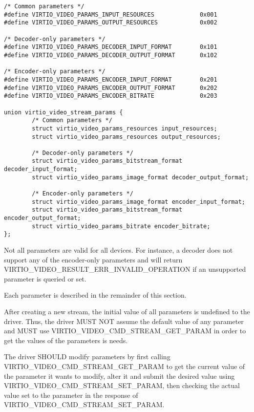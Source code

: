 \begin{lstlisting}
/* Common parameters */
#define VIRTIO_VIDEO_PARAMS_INPUT_RESOURCES             0x001
#define VIRTIO_VIDEO_PARAMS_OUTPUT_RESOURCES            0x002

/* Decoder-only parameters */
#define VIRTIO_VIDEO_PARAMS_DECODER_INPUT_FORMAT        0x101
#define VIRTIO_VIDEO_PARAMS_DECODER_OUTPUT_FORMAT       0x102

/* Encoder-only parameters */
#define VIRTIO_VIDEO_PARAMS_ENCODER_INPUT_FORMAT        0x201
#define VIRTIO_VIDEO_PARAMS_ENCODER_OUTPUT_FORMAT       0x202
#define VIRTIO_VIDEO_PARAMS_ENCODER_BITRATE             0x203

union virtio_video_stream_params {
        /* Common parameters */
        struct virtio_video_params_resources input_resources;
        struct virtio_video_params_resources output_resources;

        /* Decoder-only parameters */
        struct virtio_video_params_bitstream_format decoder_input_format;
        struct virtio_video_params_image_format decoder_output_format;

        /* Encoder-only parameters */
        struct virtio_video_params_image_format encoder_input_format;
        struct virtio_video_params_bitstream_format encoder_output_format;
        struct virtio_video_params_bitrate encoder_bitrate;
};
\end{lstlisting}

Not all parameters are valid for all devices. For instance, a decoder
does not support any of the encoder-only parameters and will return
VIRTIO\_VIDEO\_RESULT\_ERR\_INVALID\_OPERATION if an unsupported
parameter is queried or set.

Each parameter is described in the remainder of this section.


After creating a new stream, the initial value of all parameters is
undefined to the driver. Thus, the driver MUST NOT assume the default
value of any parameter and MUST use
VIRTIO\_VIDEO\_CMD\_STREAM\_GET\_PARAM in order to get the values of the
parameters is needs.

The driver SHOULD modify parameters by first calling
VIRTIO\_VIDEO\_CMD\_STREAM\_GET\_PARAM to get the current value of the
parameter it wants to modify, alter it and submit the desired value
using VIRTIO\_VIDEO\_CMD\_STREAM\_SET\_PARAM, then checking the actual
value set to the parameter in the response of
VIRTIO\_VIDEO\_CMD\_STREAM\_SET\_PARAM.

